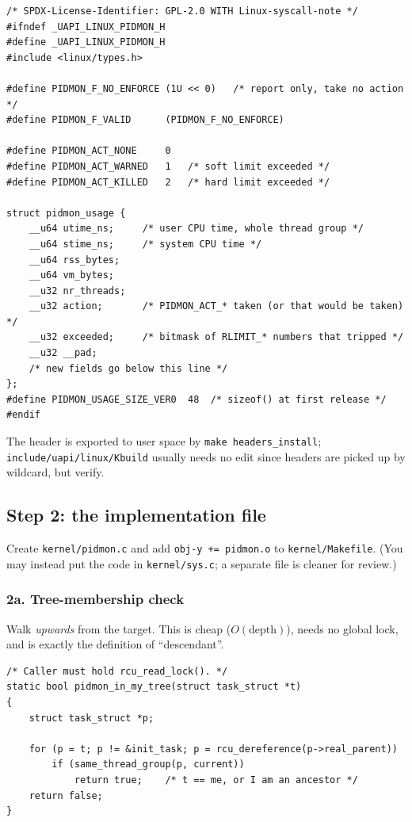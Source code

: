 \documentclass[11pt,a4paper]{article}
\newcommand{\kfile}[1]{\texttt{\small #1}}
\begin{document}
\begin{lstlisting}
/* SPDX-License-Identifier: GPL-2.0 WITH Linux-syscall-note */
#ifndef _UAPI_LINUX_PIDMON_H
#define _UAPI_LINUX_PIDMON_H
#include <linux/types.h>

#define PIDMON_F_NO_ENFORCE	(1U << 0)	/* report only, take no action */
#define PIDMON_F_VALID		(PIDMON_F_NO_ENFORCE)

#define PIDMON_ACT_NONE		0
#define PIDMON_ACT_WARNED	1	/* soft limit exceeded */
#define PIDMON_ACT_KILLED	2	/* hard limit exceeded */

struct pidmon_usage {
	__u64 utime_ns;		/* user CPU time, whole thread group */
	__u64 stime_ns;		/* system CPU time */
	__u64 rss_bytes;
	__u64 vm_bytes;
	__u32 nr_threads;
	__u32 action;		/* PIDMON_ACT_* taken (or that would be taken) */
	__u32 exceeded;		/* bitmask of RLIMIT_* numbers that tripped */
	__u32 __pad;
	/* new fields go below this line */
};
#define PIDMON_USAGE_SIZE_VER0	48	/* sizeof() at first release */
#endif
\end{lstlisting}
The header is exported to user space by \texttt{make headers\_install}; \kfile{include/uapi/linux/Kbuild} usually needs no edit since headers are picked up by wildcard, but verify.

\subsection{Step 2: the implementation file}
Create \kfile{kernel/pidmon.c} and add \texttt{obj-y += pidmon.o} to \kfile{kernel/Makefile}. (You may instead put the code in \kfile{kernel/sys.c}; a separate file is cleaner for review.)

\subsubsection*{2a. Tree-membership check}
Walk \emph{upwards} from the target. This is cheap ($O(\text{depth})$), needs no global lock, and is exactly the definition of ``descendant''.

\begin{lstlisting}
/* Caller must hold rcu_read_lock(). */
static bool pidmon_in_my_tree(struct task_struct *t)
{
	struct task_struct *p;

	for (p = t; p != &init_task; p = rcu_dereference(p->real_parent))
		if (same_thread_group(p, current))
			return true;	/* t == me, or I am an ancestor */
	return false;
}
\end{lstlisting}
\end{document}
